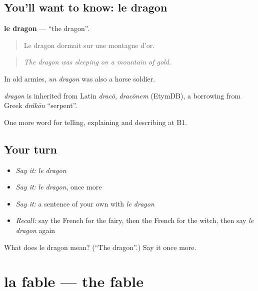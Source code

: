 \subsection*{You'll want to know: le dragon}
\textbf{le dragon} — \textquotedblleft{}the dragon\textquotedblright{}.

\begin{quote}
Le dragon dormait sur une montagne d'or.
\end{quote}

\begin{quote}
\emph{The dragon was sleeping on a mountain of gold.}
\end{quote}

In old armies, \emph{un dragon} was also a horse soldier.

\begin{cousinweb}
\emph{dragon} is inherited from Latin \emph{dracō}, \emph{dracōnem} (EtymDB), a borrowing from Greek \emph{drákōn} \textquotedblleft{}serpent\textquotedblright{}.
\end{cousinweb}

\begin{grammarlens}[title={What you've built}]
One more word for telling, explaining and describing at B1.
\end{grammarlens}

\subsection*{Your turn}
\begin{itemize}
\raggedright
  \item \emph{Say it:} \emph{le dragon}
  \item \emph{Say it:} \emph{le dragon}, once more
  \item \emph{Say it:} a sentence of your own with \emph{le dragon}
  \item \emph{Recall:} say the French for the fairy, then the French for the witch, then say \emph{le dragon} again
\end{itemize}

\begin{tcolorbox}[breakable,colback=teal!4,colframe=teal!35!black,title={Before you move on}]
What does le dragon mean? (\textquotedblleft{}The dragon\textquotedblright{}.) Say it once more.
\end{tcolorbox}
\section[la fable]{la fable — the fable}

